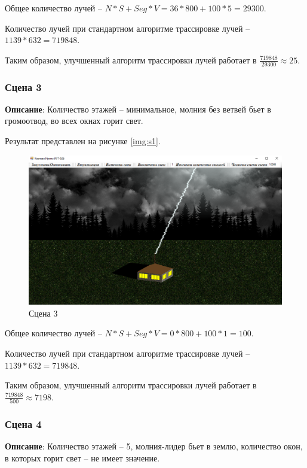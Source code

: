 Общее количество лучей -- $ N * S + Seg * V = 36 * 800 + 100 * 5 = 29 300$.

Количество лучей при стандартном алгоритме трассировке лучей -- $1139 * 632 = 719 848$. 

Таким образом, улучшенный алгоритм трассировки лучей работает в $\frac{719 848}{29 300} \approx 25$. 


\subsubsection{Сцена 3}
\textbf{Описание}: Количество этажей -- минимальное, молния без ветвей бьет в громоотвод, во всех окнах горит свет. 

Результат представлен на рисунке \ref{img:s1}.
\begin{figure}[H]
	\begin{center}
		\includegraphics[scale=0.40]{img/prog_res/s3.png}
	\end{center}
	\captionsetup{justification=centering}
	\caption{Сцена 3}
	\label{img:s3}
\end{figure}

Общее количество лучей -- $ N * S + Seg * V = 0 * 800 + 100 * 1 = 100$.

Количество лучей при стандартном алгоритме трассировке лучей -- $1139 * 632 = 719 848$. 

Таким образом, улучшенный алгоритм трассировки лучей работает в $\frac{719 848}{500} \approx 7198$. 

\subsubsection{Сцена 4}
\textbf{Описание}: Количество этажей -- 5, молния-лидер бьет в землю, количество окон, в которых горит свет -- не имеет значение.

